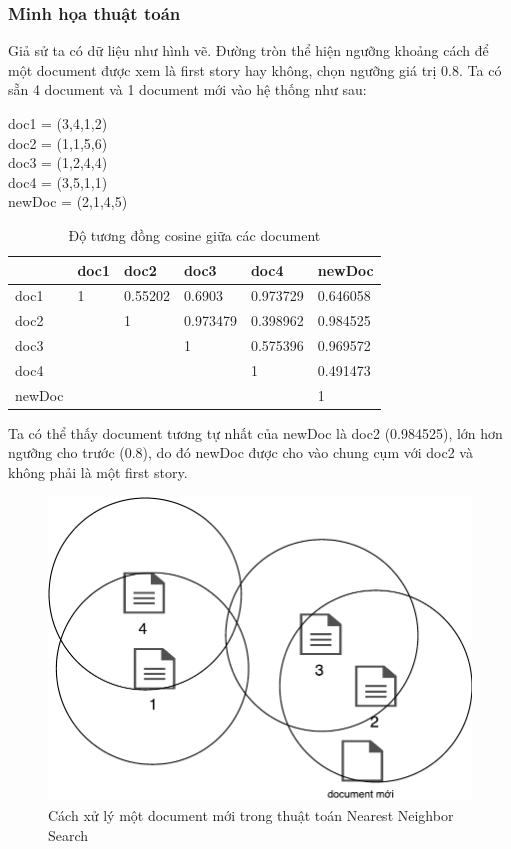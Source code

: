 	\subsubsection{Minh họa thuật toán}
		Giả sử ta có dữ liệu như hình vẽ. Đường tròn thể hiện ngưỡng khoảng cách để một document được xem là first story hay không, chọn ngưỡng giá trị 0.8. Ta có sẵn 4 document và 1 document mới vào hệ thống như sau:
		\begin{center}
					doc1 = (3,4,1,2)\\
				doc2 = (1,1,5,6)\\
				doc3 = (1,2,4,4)\\
				doc4 = (3,5,1,1)\\
				newDoc = (2,1,4,5)\\
		\end{center}
		\begin{table}[H]
			\centering
			\begin{tabular}{|p{1.5cm}|p{1.5cm}|p{1.5cm}|p{1.5cm}|p{1.5cm}|p{1.5cm}|}
				\hline
				& doc1 & doc2 & doc3 & doc4 & \textbf{newDoc} \\
				\hline 
				doc1 & 1 & 0.55202 & 0.6903 	& 0.973729 & 0.646058 \\
				doc2 &   & 1 		& 0.973479 	& 0.398962 & 0.984525 \\
				doc3 &   &   		& 1			& 0.575396 & 0.969572 \\
				doc4 &   &  		&  			& 1 	& 0.491473 \\
				newDoc &   &  		&  			&   	& 1 \\
				\hline
			\end{tabular}
			\caption{Độ tương đồng cosine giữa các document} \label{tab:table_1_1}
		
		\end{table}
		Ta có thể thấy document tương tự nhất của newDoc là doc2 (0.984525), lớn hơn ngưỡng cho trước (0.8), do đó newDoc được cho vào chung cụm với doc2 và không phải là một first story.
	
		\begin{figure}[H]
			\begin{center}
				\includegraphics[width=0.9\linewidth]{NNS.pdf}
				\caption{Cách xử lý một document mới trong thuật toán Nearest Neighbor Search}
			\end{center}
		\end{figure}
		
